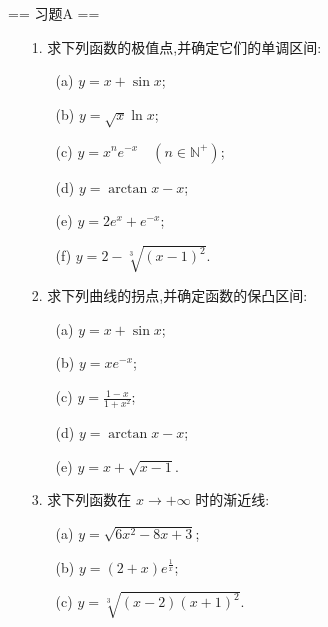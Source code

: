\newenvironment{solution}{\begin{proofc}[解答]}{\end{proofc}}

== 习题A ==

\begin{enumerate}
    \item[1.]求下列函数的极值点,并确定它们的单调区间:
    \begin{enumerate}
        \item[(a)]$\displaystyle y = x + \sin x$;
        \item[(b)]$\displaystyle y = \sqrt{x}\ln x$;
        \item[(c)]$\displaystyle y = x^{n}e^{-x} \quad (n\in \mathbb{N}^{+})$;
        \item[(d)]$\displaystyle y = \arctan x - x$;
        \item[(e)]$\displaystyle y = 2e^{x} + e^{-x}$;
        \item[(f)]$\displaystyle y = 2 - \sqrt[3]{(x - 1)^{2}}$.
    \end{enumerate}
    \item[2.]求下列曲线的拐点,并确定函数的保凸区间:
    \begin{enumerate}
        \item[(a)]$\displaystyle y = x + \sin x$;
        \item[(b)]$\displaystyle y = xe^{-x}$;
        \item[(c)]$\displaystyle y = \frac{1 - x}{1 + x^{2}}$;
        \item[(d)]$\displaystyle y = \arctan x - x$;
        \item[(e)]$\displaystyle y = x + \sqrt{x - 1}$.
    \end{enumerate}
    \item[3.]求下列函数在 \(x\rightarrow +\infty\) 时的渐近线:
    \begin{enumerate}
        \item[(a)]$\displaystyle y = \sqrt{6x^{2} - 8x + 3}$;
        \item[(b)]$\displaystyle y = (2 + x)e^{\frac{1}{x}}$;
        \item[(c)]$\displaystyle y = \sqrt[3]{(x - 2)(x + 1)^{2}}$.

\end{enumerate}
\end{enumerate}

